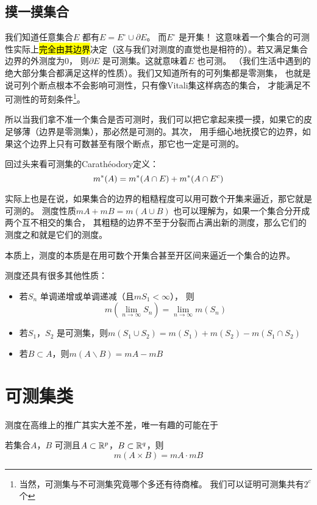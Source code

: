 \subsection{摸一摸集合}
我们知道任意集合\(E\) 都有\(E=E^{\circ} \cup \partial E\)。
而\(E^{\circ}\) 是开集！
这意味着一个集合的可测性实际上\hl{完全由其边界}决定（这与我们对测度的直觉也是相符的）。若又满足集合边界的外测度为0，
则\(\partial E\) 是可测集。这就意味着\(E\) 也可测。
（我们生活中遇到的绝大部分集合都满足这样的性质）。我们又知道所有的可列集都是零测集，
也就是说可列个断点根本不会影响可测性，只有像Vitali集这样病态的集合，
才能满足不可测性的苛刻条件\footnote{当然，可测集与不可测集究竟哪个多还有待商榷。
我们可以证明可测集共有\(2^{c}\) 个}。

所以当我们拿不准一个集合是否可测时，我们可以把它拿起来摸一摸，如果它的皮足够薄（边界是零测集），那必然是可测的。其次，
用手细心地抚摸它的边界，如果这个边界上只有可数甚至有限个断点，那它也一定是可测的。

回过头来看可测集的Carathéodory定义： \[
    m^{*}(A)=m^{*}(A\cap E)+m^{*}(A\cap E^{c})
\]

实际上也是在说，如果集合的边界的粗糙程度可以用可数个开集来逼近，那它就是可测的。
测度性质\(mA+mB=m(A\cup B)\) 也可以理解为，如果一个集合分开成两个互不相交的集合，
其粗糙的边界不至于分裂而占满出新的测度，那么它们的测度之和就是它们的测度。

本质上，测度的本质是在用可数个开集合甚至开区间来逼近一个集合的边界。

测度还具有很多其他性质：
\begin{itemize}
    \item 若\({S_{n}}\) 单调递增或单调递减（且\(mS_{1}<\infty\)），
        则\[m(\lim_{n \to \infty} S_{n})=\lim_{n\to
        \infty} m(S_{n})\]
    \item 若\(S_{1}\)，\(S_{2}\) 是可测集，则\(
        m(S_{1}\cup S_{2})=m(S_{1})+m(S_{2})-m(S_{1}\cap S_{2})\)
    \item 若\(B \subset A\)，则\(m(A \backslash B)=mA-mB\)
\end{itemize}
\section{可测集类}

测度在高维上的推广其实大差不差，唯一有趣的可能在于

\begin{theorem}{}{}
    若集合\(A\)，\(B\) 可测且\(A\subset \mathbb{R}^{p}\)，\(B \subset \mathbb{R}^{q} \)，则\[
        m(A\times B)=mA \cdot mB
    \]
\end{theorem}

